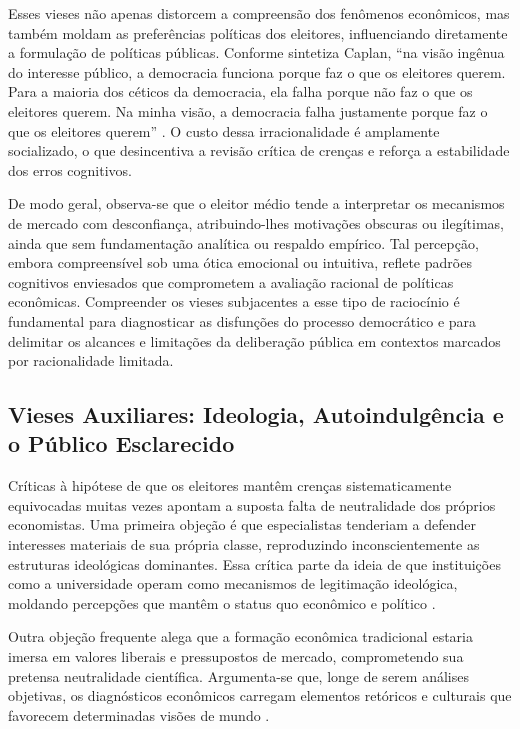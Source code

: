 Esses vieses não apenas distorcem a compreensão dos fenômenos econômicos, mas também moldam as preferências políticas dos eleitores, influenciando diretamente a formulação de políticas públicas. Conforme sintetiza Caplan, ``na visão ingênua do interesse público, a democracia funciona porque faz o que os eleitores querem. Para a maioria dos céticos da democracia, ela falha porque não faz o que os eleitores querem. Na minha visão, a democracia falha justamente porque faz o que os eleitores querem'' \cite[p.~3]{The_Myth_of_the_Rational_Voter}. O custo dessa irracionalidade é amplamente socializado, o que desincentiva a revisão crítica de crenças e reforça a estabilidade dos erros cognitivos.

De modo geral, observa-se que o eleitor médio tende a interpretar os mecanismos de mercado com desconfiança, atribuindo-lhes motivações obscuras ou ilegítimas, ainda que sem fundamentação analítica ou respaldo empírico. Tal percepção, embora compreensível sob uma ótica emocional ou intuitiva, reflete padrões cognitivos enviesados que comprometem a avaliação racional de políticas econômicas. Compreender os vieses subjacentes a esse tipo de raciocínio é fundamental para diagnosticar as disfunções do processo democrático e para delimitar os alcances e limitações da deliberação pública em contextos marcados por racionalidade limitada.

\subsection{Vieses Auxiliares: Ideologia, Autoindulgência e o Público Esclarecido}
\label{sec:vieses_auxiliares}

Críticas à hipótese de que os eleitores mantêm crenças sistematicamente equivocadas muitas vezes apontam a suposta falta de neutralidade dos próprios economistas. Uma primeira objeção é que especialistas tenderiam a defender interesses materiais de sua própria classe, reproduzindo inconscientemente as estruturas ideológicas dominantes. Essa crítica parte da ideia de que instituições como a universidade operam como mecanismos de legitimação ideológica, moldando percepções que mantêm o status quo econômico e político \cite{althusser1971ideology, The_Myth_of_the_Rational_Voter}.

Outra objeção frequente alega que a formação econômica tradicional estaria imersa em valores liberais e pressupostos de mercado, comprometendo sua pretensa neutralidade científica. Argumenta-se que, longe de serem análises objetivas, os diagnósticos econômicos carregam elementos retóricos e culturais que favorecem determinadas visões de mundo \cite{mccloskey1998rhetoric, The_Myth_of_the_Rational_Voter}.

